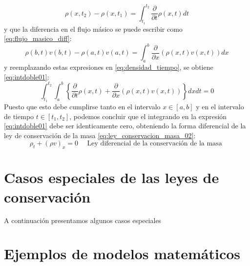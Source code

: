 \begin{equation}\label{eq:densidad_variable}
\rho\left(x, t_{2}\right)-\rho\left(x, t_{1}\right)=\int_{t_{1}}^{t_{2}} \frac{\partial}{\partial t} \rho(x, t) d t
\end{equation}
y que la diferencia en el flujo másico se puede escribir como \eqref{eq:flujo_masico_diff}: 
\begin{equation}\label{eq:flujo_masico_diff}
\rho\left(b, t\right) v\left(b, t\right)-\rho\left(a, t\right) v\left(a, t\right)=\int_{a}^{b} \frac{\partial}{\partial x}(\rho(x, t) v(x, t)) d x
\end{equation}
y reemplazando estas expresiones en \eqref{eq:densidad_tiempo}, se obtiene \eqref{eq:intdoble01}:
\begin{equation}\label{eq:intdoble01}
\int_{t_{1}}^{t_{2}} \int_{a}^{b}\left\{\frac{\partial}{\partial t} \rho(x, t)+\frac{\partial}{\partial x}(\rho(x, t) v(x, t))\right\} d x d t=0
\end{equation}
Puesto que esto debe cumplirse tanto en el intervalo  $x\in\left[a, b\right]$ y en el intervalo de tiempo $t\in\left[t_{1}, t_{2}\right]$, podemos concluir que el integrando en la expresión \eqref{eq:intdoble01} debe ser identicamente cero, obteniendo la forma diferencial de la ley de conservación de la masa \eqref{eq:ley_conservacion_masa_02}:
\begin{equation}\label{eq:ley_conservacion_masa_02}
\rho_{t}+(\rho v)_{x}=0 \quad \text { Ley diferencial de la conservación de la masa }
\end{equation}

\section{Casos especiales de las leyes de conservación}
A continuación presentamos algunos casos especiales

\section{Ejemplos de modelos matemáticos}


